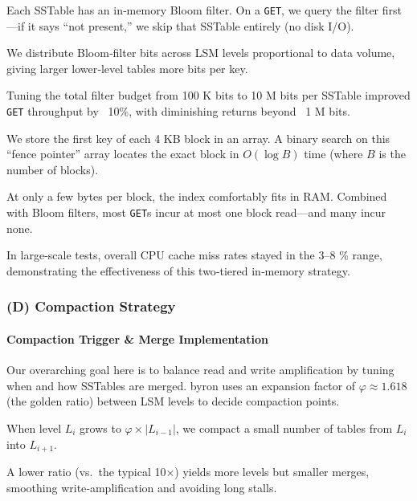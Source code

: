 \documentclass[10pt]{article}
\begin{document}
\begin{description}[leftmargin=1em,labelwidth=*,itemsep=0.5ex]
  \item[Per‐SSTable Filters] Each SSTable has an in‐memory Bloom filter. On a \texttt{GET}, we query the filter first—if it says “not present,” we skip that SSTable entirely (no disk I/O).
  \item[Monkey‐Inspired Allocation] We distribute Bloom‐filter bits across LSM levels proportional to data volume, giving larger lower‐level tables more bits per key.
  \item[Performance Impact] Tuning the total filter budget from 100 K bits to 10 M bits per SSTable improved \texttt{GET} throughput by ~10\%, with diminishing returns beyond ~1 M bits.
  \item[Sparse In‐Memory Index] We store the first key of each 4 KB block in an array. A binary search on this “fence pointer” array locates the exact block in $O(\log B)$ time (where $B$ is the number of blocks).
  \item[Compact \& Fast] At only a few bytes per block, the index comfortably fits in RAM. Combined with Bloom filters, most \texttt{GET}s incur at most one block read—and many incur none.\@
  \item[Cache Efficiency] In large‐scale tests, overall CPU cache miss rates stayed in the 3–8 \% range, demonstrating the effectiveness of this two‐tiered in‐memory strategy.
\end{description}


\subsubsection*{(D) Compaction Strategy}

\paragraph{Compaction Trigger \& Merge Implementation}
Our overarching goal here is to balance read and write amplification by tuning when and how SSTables are merged. byron uses an expansion factor of $\varphi\approx1.618$ (the golden ratio) between LSM levels to decide compaction points.

\begin{description}[leftmargin=1em,labelwidth=*,itemsep=0.5ex]
  \item[Size Ratio] When level $L_{i}$ grows to $\varphi \times |L_{i-1}|$, we compact a small number of tables from $L_{i}$ into $L_{i+1}$.
  \item[Frequent, Small Jobs] A lower ratio (vs.\ the typical 10×) yields more levels but smaller merges, smoothing write‐amplification and avoiding long stalls.
\end{description}
\end{document}
